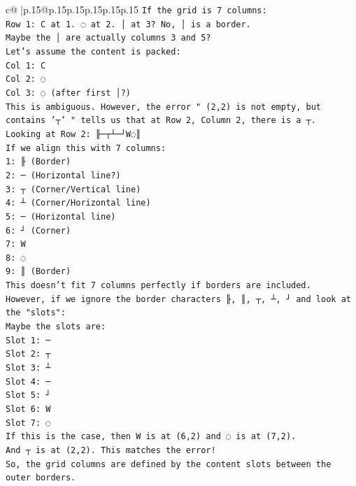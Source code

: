 \documentclass{article}
\begin{document}
{\begin{supertabular}{c@{$\;$}|p{.15\linewidth}@{}p{.15\linewidth}p{.15\linewidth}p{.15\linewidth}p{.15\linewidth}p{.15\linewidth}}
{{{\texttt{If the grid is 7 columns:} \\
\texttt{Row 1: C at 1. ◌ at 2. │ at 3? No, │ is a border.} \\
\texttt{Maybe the │ are actually columns 3 and 5?} \\
\texttt{Let's assume the content is packed:} \\
\texttt{Col 1: C} \\
\texttt{Col 2: ◌} \\
\texttt{Col 3: ◌ (after first │?)} \\
\texttt{This is ambiguous. However, the error " (2,2) is not empty, but contains '┬' " tells us that at Row 2, Column 2, there is a ┬.} \\
\texttt{Looking at Row 2: ╟─┬┴─┘W◌║} \\
\texttt{If we align this with 7 columns:} \\
\texttt{1: ╟ (Border)} \\
\texttt{2: ─ (Horizontal line?)} \\
\texttt{3: ┬ (Corner/Vertical line)} \\
\texttt{4: ┴ (Corner/Horizontal line)} \\
\texttt{5: ─ (Horizontal line)} \\
\texttt{6: ┘ (Corner)} \\
\texttt{7: W} \\
\texttt{8: ◌} \\
\texttt{9: ║ (Border)} \\
\texttt{This doesn't fit 7 columns perfectly if borders are included.} \\
\texttt{However, if we ignore the border characters ╟, ║, ┬, ┴, ┘ and look at the "slots":} \\
\texttt{Maybe the slots are:} \\
\texttt{Slot 1: ─} \\
\texttt{Slot 2: ┬} \\
\texttt{Slot 3: ┴} \\
\texttt{Slot 4: ─} \\
\texttt{Slot 5: ┘} \\
\texttt{Slot 6: W} \\
\texttt{Slot 7: ◌} \\
\texttt{If this is the case, then W is at (6,2) and ◌ is at (7,2).} \\
\texttt{And ┬ is at (2,2). This matches the error!} \\
\texttt{So, the grid columns are defined by the content slots between the outer borders.} \\
}}}
\end{supertabular}}
\end{document}
